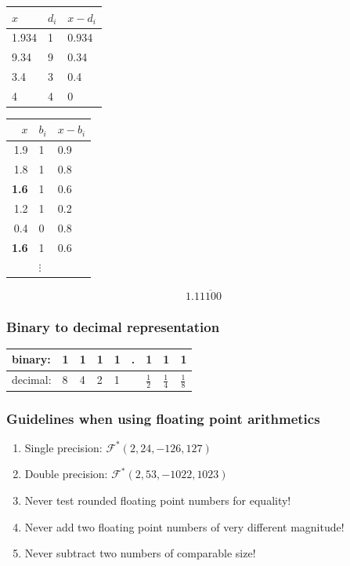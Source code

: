 \documentclass[10pt,a4paper]{scrartcl}
\begin{document}
\begin{multicols*}{2}
\begin{minipage}{0.45\linewidth}
\begin{center}
\begin{tabular}{l|l|l}
$x$&$d_i$&$x-d_i$\\\hline
1.934&1&0.934\\
9.34&9&0.34\\
3.4&3&0.4\\
4&4&0
\end{tabular}
\end{center}
\end{minipage}
\hfill
\begin{minipage}{0.45\linewidth}
\begin{center}

\begin{tabular}{r|l|l}
$x$&$b_i$&$x-b_i$\\\hline
1.9&1&0.9\\
1.8&1&0.8\\
\textbf{1.6}&1&0.6\\
1.2&1&0.2\\
0.4&0&0.8\\
\textbf{1.6}&1&0.6\\
&$\vdots$&
\end{tabular}
\end{center}
\begin{equation*}
1.1\overline{1100}
\end{equation*}
\end{minipage}

\subsubsection{Binary to decimal representation}

\begin{center}
\begin{tabular}{ll|l|l|l|l|l|l|l}
binary:&1&1&1&1&.&1&1&1\\\hline
decimal:&8&4&2&1&&$\frac{1}{2}$&$\frac{1}{4}$&$\frac{1}{8}$
\end{tabular}
\end{center}

\subsubsection{Guidelines when using floating point arithmetics}

\begin{enumerate}
\item Single precision: $\mathcal{F}^\ast(2,24,-126,127)$
\item Double precision: $\mathcal{F}^\ast(2,53,-1022,1023)$
\item Never test rounded floating point numbers for equality!
\item Never add two floating point numbers of very different magnitude!
\item Never subtract two numbers of comparable size!
\end{enumerate}


\end{multicols*}
\end{document}
